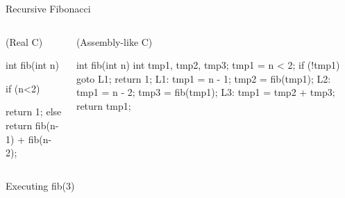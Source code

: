 \documentclass{plt}
\begin{document}
\begin{frame}[fragile]{Recursive Fibonacci}

\begin{columns}
  \begin{column}{0.2\textwidth}
    (Real C)

    \begin{C}
int fib(int n) {

  if (n<2)

    return 1;
  else
    return
       fib(n-1)
       +
       fib(n-2);

}
\end{C}
  \end{column}
  \begin{column}{0.5\textwidth}
    (Assembly-like C)

\begin{C}
int fib(int n) {
    int tmp1, tmp2, tmp3;
    tmp1 = n < 2;
    if (!tmp1) goto L1;
    return 1;
L1: tmp1 = n - 1;
    tmp2 = fib(tmp1);
L2: tmp1 = n - 2;
    tmp3 = fib(tmp1);
L3: tmp1 = tmp2 + tmp3;
    return tmp1;
}
\end{C}
  \end{column}
\end{columns}

\begin{center}
\footnotesize
{}
\alert{Executing fib(3)}
\end{center}
\end{frame}

\def\mynode#1{\tikz[remember picture] \node (#1) {};}
\def\fp#1{
  \node [fill,circle,inner sep=1pt] at ($(#1.north east) + (-1pc,-19pt)$)
  (#1-fp) {};}
\def\ra#1{
  \node [fill,circle,inner sep=1pt] at ($(#1.north east) + (-1pc,-6pt)$)
  (#1-ra) {};}
\def\thefp#1{
  \node [arrow box, color=white, fill=gray, arrow box arrows={east:8pt},
         anchor=east]
  at ($(#1.north west) + (0,-6pt)$) {\sffamily \bfseries FP};
}
\def\thesp#1{
  \node [arrow box, color=white, fill=gray, arrow box arrows={east:8pt},
         anchor=east]
  at ($(#1.south west) + (0,-6pt)$) {\sffamily \bfseries SP};
}
\end{document}
